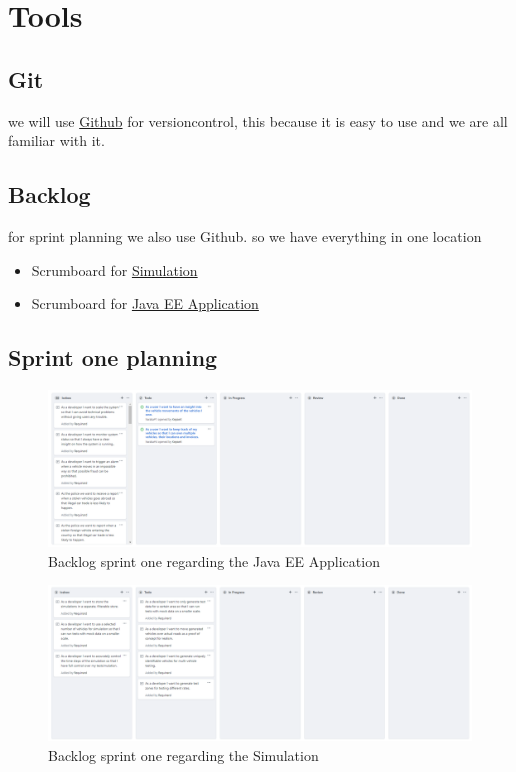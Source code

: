 \chapter{Tools}
\section{Git}
we will use \href{https://github.com/S61-Epsilon}{Github} for versioncontrol, this because it is easy to use and we are all familiar with it.

\section{Backlog}
for sprint planning we also use Github. so we have everything in one location \\

\begin{itemize} 
\item Scrumboard for \href{https://github.com/orgs/S61-Epsilon/projects/1}{Simulation}
\item Scrumboard for \href{https://github.com/orgs/S61-Epsilon/projects/2}{Java EE Application}
\end{itemize}
\newpage

\section{Sprint one planning}

\begin{figure}[h]
	\centering
	\includegraphics[width=1\linewidth]{Backlog_JavaEEApp}
	\caption{Backlog sprint one regarding the Java EE Application}
	\label{fig:backlogjavaeeapp}
\end{figure}

\begin{figure}[h]
	\centering
	\includegraphics[width=1\linewidth]{Backlog_Simulation}
	\caption{Backlog sprint one regarding the Simulation}
	\label{fig:backlogsimulation}
\end{figure}

